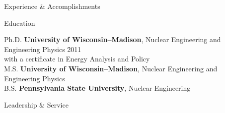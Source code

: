 \documentclass{resume3} %
\begin{document}

\begin{rSection}{Experience \& Accomplishments}

\end{rSection}

%

\vspace*{-.5em}
\begin{rSection}{Education}

\begin{tabbing}
Ph.D. \hspace*{1 em}\= \textbf{University of Wisconsin--Madison}, Nuclear Engineering and Engineering Physics \hspace*{1em} \= 2011 \\
      \> with a certificate in Energy Analysis and Policy \\
%
M.S. \hspace*{1 em}\> \textbf{University of Wisconsin--Madison}, Nuclear Engineering and Engineering Physics   \\
%
B.S. \hspace*{1 em}\> \textbf{Pennsylvania State University}, Nuclear Engineering  
\end{tabbing}
\end{rSection}
\begin{rSection}{Leadership \& Service}

\end{rSection}
\end{document}
